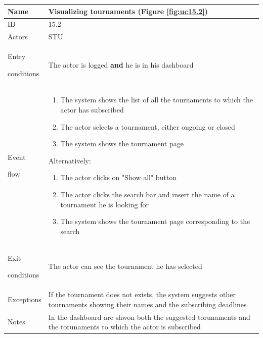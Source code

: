 \begin{center}
    \def\arraystretch{1.5}
    \begin{tabular}{| m{2cm} | m{10cm}|}
        \hline
        Name                  & Visualizing tournaments (Figure \ref{fig:uc15.2})                                                                                                 \\ \hline
        ID                    & 15.2                                                                                                                       \\ \hline
        Actors                & STU                                                                                                                        \\ \hline
        Entry \par conditions & The actor is logged \textbf{and} he is in his dashboard                                                                    \\ \hline
        Event \par flow       & \begin{enumerate}
                                    \item The system shows the list of all the tournaments to which the actor has subscribed
                                    \item The actor selects a tournament, either ongoing or closed
                                    \item The system shows the tournament page
                                \end{enumerate}
        Alternatively:
        \begin{enumerate}
            \item The actor clicks on "Show all" button
            \item The actor clicks the search bar and insert the name of a tournament he is looking for
            \item The system shows the tournament page corresponding to the search
        \end{enumerate}                                                         \\ \hline
        Exit \par conditions  & The actor can see the tournament he has selected                                                                           \\ \hline
        Exceptions            & If the tournament does not exists, the system suggests other tournaments showing their names and the subscribing deadlines \\ \hline
        Notes                 & In the dashboard are shwon both the suggested torunaments and the torunaments to which the actor is subscribed             \\ \hline
    \end{tabular}
\end{center}


